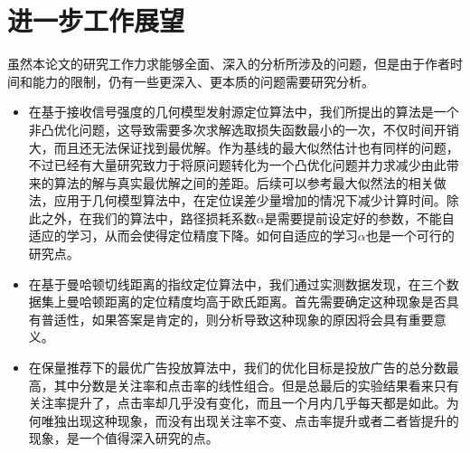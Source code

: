 \section{进一步工作展望}

虽然本论文的研究工作力求能够全面、深入的分析所涉及的问题，但是由于作者时间和能力的限制，仍有一些更深入、更本质的问题需要研究分析。
\begin{itemize}
	\item 在基于接收信号强度的几何模型发射源定位算法中，我们所提出的算法是一个非凸优化问题，这导致需要多次求解选取损失函数最小的一次，不仅时间开销大，而且还无法保证找到最优解。作为基线的最大似然估计也有同样的问题，不过已经有大量研究致力于将原问题转化为一个凸优化问题并力求减少由此带来的算法的解与真实最优解之间的差距。后续可以参考最大似然法的相关做法，应用于几何模型算法中，在定位误差少量增加的情况下减少计算时间。除此之外，在我们的算法中，路径损耗系数$\alpha$是需要提前设定好的参数，不能自适应的学习，从而会使得定位精度下降。如何自适应的学习$\alpha$也是一个可行的研究点。
	
	\item 在基于曼哈顿切线距离的指纹定位算法中，我们通过实测数据发现，在三个数据集上曼哈顿距离的定位精度均高于欧氏距离。首先需要确定这种现象是否具有普适性，如果答案是肯定的，则分析导致这种现象的原因将会具有重要意义。
	
	\item 在保量推荐下的最优广告投放算法中，我们的优化目标是投放广告的总分数最高，其中分数是关注率和点击率的线性组合。但是总最后的实验结果看来只有关注率提升了，点击率却几乎没有变化，而且一个月内几乎每天都是如此。为何唯独出现这种现象，而没有出现关注率不变、点击率提升或者二者皆提升的现象，是一个值得深入研究的点。
\end{itemize}



